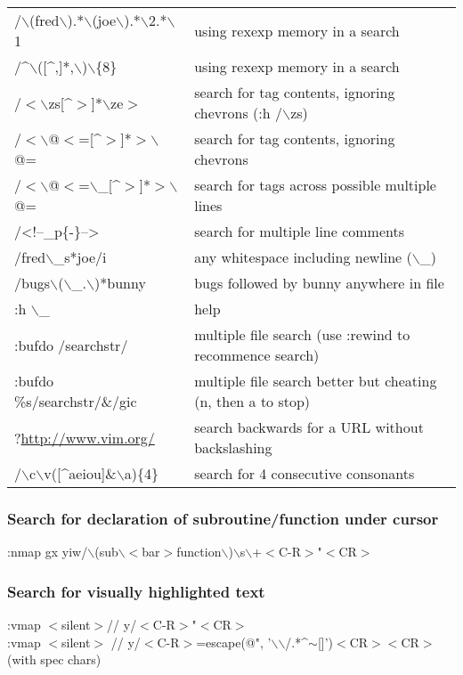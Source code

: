 \documentclass[10pt]{article}
\begin{document}
\begin{center}
\begin{longtable}{l|l}
/$\backslash$(fred$\backslash$).*$\backslash$(joe$\backslash$).*$\backslash$2.*$\backslash$1 &  using rexexp memory in a search \\
/\^{}$\backslash$([\^{},]*,$\backslash$)$\backslash$\{8\} &  using rexexp memory in a search \\
/$<$$\backslash$zs[\^{}$>$]*$\backslash$ze$>$ & search for tag contents, ignoring chevrons (:h /$\backslash$zs) \\
/$<$$\backslash$@$<$=[\^{}$>$]*$>$$\backslash$@= & search for tag contents, ignoring chevrons\\
/$<$$\backslash$@$<$=$\backslash$\_[\^{}$>$]*$>$$\backslash$@= & search for tags across possible multiple lines\\
/<!--\_p\{-\}--> & search for multiple line comments\\
/fred$\backslash$\_s*joe/i & any whitespace including newline ($\backslash$\_) \\
/bugs$\backslash$($\backslash$\_.$\backslash$)*bunny & bugs followed by bunny anywhere in file\\
:h $\backslash$\_ & help\\
:bufdo /searchstr/ & multiple file search (use :rewind to recommence search) \\
:bufdo \%s/searchstr/\&/gic & multiple file search better but cheating (n, then a to stop) \\
?\url{http://www.vim.org/} & search backwards for a URL without backslashing\\
/$\backslash$c$\backslash$v([\^{}aeiou]\&$\backslash$a)\{4\} & search for 4 consecutive consonants
\end{longtable}
\end{center}

\subsubsection{Search for declaration of subroutine/function under cursor}
:nmap gx yiw/$\backslash$(sub$\backslash$$<$bar$>$function$\backslash$)$\backslash$s$\backslash$+$<$C-R$>$"$<$CR$>$

\subsubsection{Search for visually highlighted text}
:vmap $<$silent$>$// y/$<$C-R$>$"$<$CR$>$\\
:vmap $<$silent$>$ //    y/$<$C-R$>$=escape(@", '$\backslash$$\backslash$/.*\^{}$\sim$[]')$<$CR$>$$<$CR$>$ (with spec chars)
\end{document}
